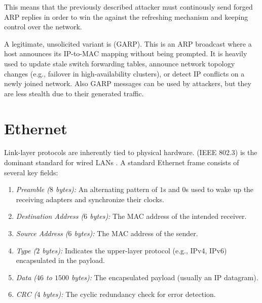 This means that the previously described attacker must continously send forged ARP replies in order to win the  against the refreshing mechanism and keeping control over the network.
    
A legitimate, unsolicited variant is  (GARP). This is an ARP broadcast where a host announces its IP-to-MAC mapping without being prompted. It is heavily used to update stale switch forwarding tables, announce network topology changes (e.g., failover in high-availability clusters), or detect IP conflicts on a newly joined network.
Also GARP messages can be used by attackers, but they are less stealth due to their generated traffic.

\section{Ethernet}
Link-layer protocols are inherently tied to physical hardware.  (IEEE 802.3) is the dominant standard for wired LANs \cite{ieee8023}. A standard Ethernet frame consists of several key fields:
\begin{enumerate}
    \item \emph{Preamble (\( 8 \) bytes):} An alternating pattern of \(1\)s and \(0\)s used to wake up the receiving adapters and synchronize their clocks.
    \item \emph{Destination Address (\( 6 \) bytes):} The MAC address of the intended receiver.
    \item \emph{Source Address (\( 6 \) bytes):} The MAC address of the sender.
    \item \emph{Type (\( 2 \) bytes):} Indicates the upper-layer protocol (e.g., IPv4, IPv6) encapsulated in the payload.
    \item \emph{Data (\( 46 \) to \( 1500 \) bytes):} The encapsulated payload (usually an IP datagram).
    \item \emph{CRC (\( 4 \) bytes):} The cyclic redundancy check for error detection.
\end{enumerate}

